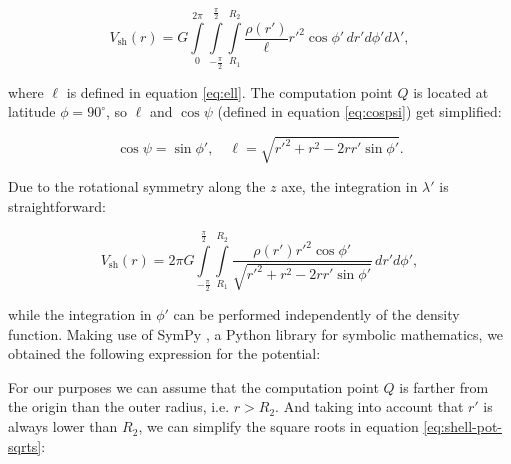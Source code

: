\documentclass[extra]{gji}
\begin{document}
\begin{equation}
    V_\text{sh}(r) = G 
    \int\limits_0^{2\pi}
    \int\limits_{-\frac{\pi}{2}}^\frac{\pi}{2}
    \int\limits_{R_1}^{R_2}
    \frac{\rho(r')}{\ell} {r'}^2 \cos\phi' \, 
    dr' d\phi' d\lambda',
\end{equation}

\noindent where $\ell$ is defined in equation \ref{eq:ell}.
The computation point $Q$ is located at latitude $\phi=90^\circ$, so 
$\ell$ and $\cos\psi$ (defined in equation \ref{eq:cospsi}) get 
simplified:

\begin{equation}
    \cos\psi = \sin\phi', \quad
    \ell = \sqrt{r'^2 + r^2 - 2 r r' \sin\phi'}.
\end{equation}

Due to the rotational symmetry along the $z$ axe, the integration in 
$\lambda'$ is straightforward:

\begin{equation}
    V_\text{sh}(r) = 2\pi G 
    \int\limits_{-\frac{\pi}{2}}^\frac{\pi}{2}
    \int\limits_{R_1}^{R_2}
    \frac{\rho(r') {r'}^2 \cos\phi'}{\sqrt{r'^2 + r^2 - 2 r r' \sin\phi'}}
    \, dr' d\phi',
\end{equation}

\noindent while the integration in $\phi'$ can be performed 
independently of the density function.
Making use of SymPy \citep{sympy2017}, a Python library for symbolic 
mathematics, we obtained the following expression for the potential:


For our purposes we can assume that the computation point $Q$ is 
farther from the origin than the outer radius, i.e. $r>R_2$. 
And taking into account that $r'$ is always lower than $R_2$, we can 
simplify the square roots in equation \ref{eq:shell-pot-sqrts}:
\end{document}
